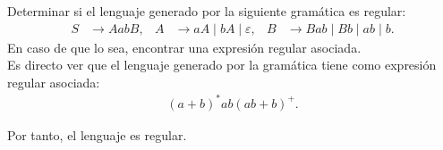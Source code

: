 \begin{ejercicio}
    Determinar si el lenguaje generado por la siguiente gramática es regular:
    \begin{align*}
        S &\to AabB, & A &\to aA \mid bA \mid \varepsilon, & B &\to Bab \mid Bb \mid ab \mid b.
    \end{align*}
    En caso de que lo sea, encontrar una expresión regular asociada.\\

    Es directo ver que el lenguaje generado por la gramática tiene como expresión regular asociada:
    \begin{align*}
        (a+b)^*ab(ab+b)^+.
    \end{align*}

    Por tanto, el lenguaje es regular.
\end{ejercicio}

